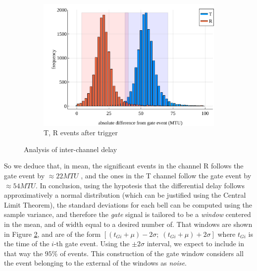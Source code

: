\documentclass[10pt, final]{article}
\begin{document}
\begin{multicols}{2}
\begin{mdframed}
\begin{figure}[H]
        \begin{subfigure}{\textwidth}
            \centering
            \includegraphics[width = \textwidth]{../images/after.pdf}
            \caption{T, R events after trigger}
            \label{after}
        \end{subfigure}
        \caption{Analysis of inter-channel delay}
    \end{figure}
\end{mdframed}
So we deduce that, in mean, the significant events in the channel R follows the gate event by $\approx 22 MTU$ , and the ones in the T channel follow the gate event by $\approx 54 MTU$.
In conclusion, using the hypotesis that the differential delay follows approximatively  a normal distribution (which can be justified using the Central Limit Theorem), the standard deviations for each bell can be computed using the sample variance, and therefore the \emph{gate} signal is tailored to be a \emph{window} centered in the mean, and of width equal to a desired number of. That windows are shown in Figure \ref{after}, and are of the form $[(t_{Gi} + \mu) -2\sigma; \; (t_{Gi} + \mu) + 2\sigma]$ where $t_{Gi}$ is the time of the $i$-th gate event. Using the $\pm 2 \sigma$ interval, we expect to include in that way the $95\%$ of events. This construction of the gate window considers all the event belonging to the external of the windows as \emph{noise}.  


\end{multicols}
\end{document}

